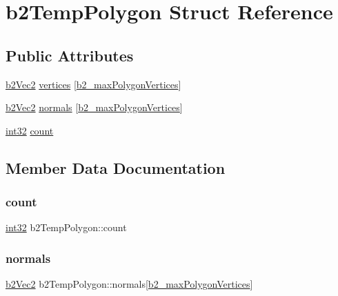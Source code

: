 \hypertarget{structb2_temp_polygon}{}\section{b2\+Temp\+Polygon Struct Reference}
\label{structb2_temp_polygon}
\subsection*{Public Attributes}
\begin{DoxyCompactItemize}
\item 
\mbox{\hyperlink{structb2_vec2}{b2\+Vec2}} \mbox{\hyperlink{structb2_temp_polygon_a7351a98f6052d1fce66e11bfc5b98a3a}{vertices}} \mbox{[}\mbox{\hyperlink{b2_settings_8h_a09d71ee1993bee28b5b2e6d893b41884}{b2\+\_\+max\+Polygon\+Vertices}}\mbox{]}
\item 
\mbox{\hyperlink{structb2_vec2}{b2\+Vec2}} \mbox{\hyperlink{structb2_temp_polygon_a45b9db5dcbcb66170029e9a2f524fc6a}{normals}} \mbox{[}\mbox{\hyperlink{b2_settings_8h_a09d71ee1993bee28b5b2e6d893b41884}{b2\+\_\+max\+Polygon\+Vertices}}\mbox{]}
\item 
\mbox{\hyperlink{b2_settings_8h_a43d43196463bde49cb067f5c20ab8481}{int32}} \mbox{\hyperlink{structb2_temp_polygon_a5b08379f676f8498190c398d9ec3d0a5}{count}}
\end{DoxyCompactItemize}


\subsection{Member Data Documentation}
\mbox{\label{structb2_temp_polygon_a5b08379f676f8498190c398d9ec3d0a5}} 
\subsubsection{\texorpdfstring{count}{count}}
{\footnotesize\ttfamily \mbox{\hyperlink{b2_settings_8h_a43d43196463bde49cb067f5c20ab8481}{int32}} b2\+Temp\+Polygon\+::count}

\mbox{\label{structb2_temp_polygon_a45b9db5dcbcb66170029e9a2f524fc6a}} 
\subsubsection{\texorpdfstring{normals}{normals}}
{\footnotesize\ttfamily \mbox{\hyperlink{structb2_vec2}{b2\+Vec2}} b2\+Temp\+Polygon\+::normals\mbox{[}\mbox{\hyperlink{b2_settings_8h_a09d71ee1993bee28b5b2e6d893b41884}{b2\+\_\+max\+Polygon\+Vertices}}\mbox{]}}

